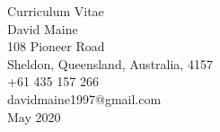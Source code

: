 \begin{titlepage}
    \vspace*{5em}
    \begin{center}
        \huge{Curriculum Vitae} \\[0.2em]
        \large{
            David Maine\\
            108 Pioneer Road\\ 
            Sheldon, Queensland, Australia, 4157\\
            +61 435 157 266\\
            davidmaine1997@gmail.com\\[2em]
            May 2020
        }
    \end{center}
    \vspace*{\fill}
\end{titlepage}
\restoregeometry